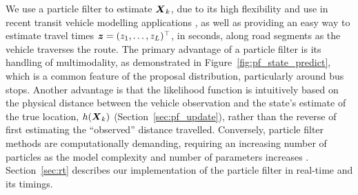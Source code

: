 We use a particle filter to estimate $\mbox{$\boldsymbol{X}$}_k$,
due to its high flexibility and use in recent 
transit vehicle modelling applications \citep{Hans_2015},
as well as providing an easy way to estimate travel times
$\boldsymbol{z} = (z_1,\ldots,z_L)^\top$, in seconds, along road segments
as the vehicle traverses the route.
The primary advantage of a particle filter is its handling of multimodality,
as demonstrated in Figure~\ref{fig:pf_state_predict},
which is a common feature of the proposal distribution, particularly around bus stops.
Another advantage is that the likelihood function is intuitively based
on the physical distance between the vehicle observation and the state's
estimate of the true location, $h(\mbox{$\boldsymbol{X}$}_k)$ (Section~\ref{sec:pf_update}),
rather than the reverse of first estimating the ``observed'' distance travelled.
Conversely, particle filter methods are computationally demanding,
requiring an increasing number of particles as the model complexity and
number of parameters increases \citep{Carpenter_1999}.
Section~\ref{sec:rt} describes our implementation of the particle filter in real-time 
and its timings.



